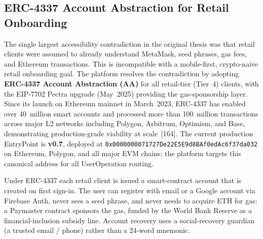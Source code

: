 \documentclass[12pt,a4paper]{report}
\begin{document}
\subsection{ERC-4337 Account Abstraction for Retail Onboarding}
\label{sec:erc4337}

The single largest accessibility contradiction in the original thesis was that retail clients were assumed to already understand MetaMask, seed phrases, gas fees, and Ethereum transactions. This is incompatible with a mobile-first, crypto-naive retail onboarding goal. The platform resolves the contradiction by adopting \textbf{ERC-4337 Account Abstraction (AA)} for all retail-tier (Tier~4) clients, with the EIP-7702 Pectra upgrade (May~2025) providing the gas-sponsorship layer. Since its launch on Ethereum mainnet in March~2023, ERC-4337 has enabled over 40~million smart accounts and processed more than 100~million transactions across major L2 networks including Polygon, Arbitrum, Optimism, and Base, demonstrating production-grade viability at scale~[164]. The current production EntryPoint is \textbf{v0.7}, deployed at \texttt{0x0000000071727De22E5E9d8BAf0edAc6f37da032} on Ethereum, Polygon, and all major EVM chains; the platform targets this canonical address for all UserOperation routing.

Under ERC-4337 each retail client is issued a smart-contract account that is created on first sign-in. The user can register with email or a Google account via Firebase Auth, never sees a seed phrase, and never needs to acquire ETH for gas: a Paymaster contract sponsors the gas, funded by the World Bank Reserve as a financial-inclusion subsidy line. Account recovery uses a social-recovery guardian (a trusted email / phone) rather than a 24-word mnemonic.
\end{document}

